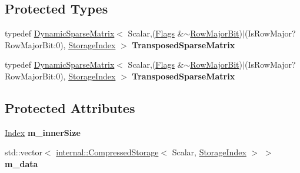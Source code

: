\subsection*{Protected Types}
\begin{DoxyCompactItemize}
\item 
\mbox{\label{class_eigen_1_1_dynamic_sparse_matrix_abfa60351ae393bd2fbffff6e39e99ae9}} 
typedef \hyperlink{class_eigen_1_1_dynamic_sparse_matrix}{Dynamic\+Sparse\+Matrix}$<$ Scalar,(\hyperlink{group___sparse_core___module_a726a12d2ba40a5f476c247c8f6db39d9ab5d909e7026be6ee6dccbbc629842a93}{Flags} \&$\sim$\hyperlink{group__flags_gae4f56c2a60bbe4bd2e44c5b19cbe8762}{Row\+Major\+Bit})$\vert$(Is\+Row\+Major?Row\+Major\+Bit\+:0), \hyperlink{group___sparse_core___module_a0b540ba724726ebe953f8c0df06081ed}{Storage\+Index} $>$ {\bfseries Transposed\+Sparse\+Matrix}
\item 
\mbox{\label{class_eigen_1_1_dynamic_sparse_matrix_abfa60351ae393bd2fbffff6e39e99ae9}} 
typedef \hyperlink{class_eigen_1_1_dynamic_sparse_matrix}{Dynamic\+Sparse\+Matrix}$<$ Scalar,(\hyperlink{group___sparse_core___module_a726a12d2ba40a5f476c247c8f6db39d9ab5d909e7026be6ee6dccbbc629842a93}{Flags} \&$\sim$\hyperlink{group__flags_gae4f56c2a60bbe4bd2e44c5b19cbe8762}{Row\+Major\+Bit})$\vert$(Is\+Row\+Major?Row\+Major\+Bit\+:0), \hyperlink{group___sparse_core___module_a0b540ba724726ebe953f8c0df06081ed}{Storage\+Index} $>$ {\bfseries Transposed\+Sparse\+Matrix}
\end{DoxyCompactItemize}
\subsection*{Protected Attributes}
\begin{DoxyCompactItemize}
\item 
\mbox{\label{class_eigen_1_1_dynamic_sparse_matrix_a3a3b2847047c854024d82751f1d04d36}} 
\hyperlink{group___core___module_a554f30542cc2316add4b1ea0a492ff02}{Index} {\bfseries m\+\_\+inner\+Size}
\item 
\mbox{\label{class_eigen_1_1_dynamic_sparse_matrix_a725975fc01821838aa5e7f2e6c85ddbe}} 
std\+::vector$<$ \hyperlink{class_eigen_1_1internal_1_1_compressed_storage}{internal\+::\+Compressed\+Storage}$<$ Scalar, \hyperlink{group___sparse_core___module_a0b540ba724726ebe953f8c0df06081ed}{Storage\+Index} $>$ $>$ {\bfseries m\+\_\+data}
\end{DoxyCompactItemize}
